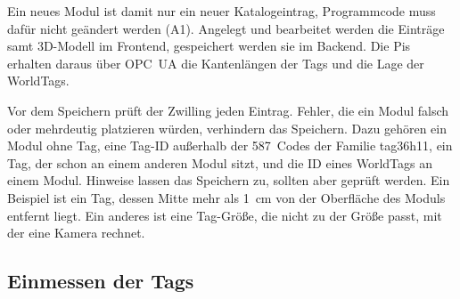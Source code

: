 Ein neues Modul ist damit nur ein neuer Katalogeintrag, Programmcode muss dafür nicht geändert werden (A1). Angelegt und bearbeitet werden die Einträge samt 3D-Modell im Frontend, gespeichert werden sie im Backend. Die Pis erhalten daraus über OPC~UA die Kantenlängen der Tags und die Lage der WorldTags.

Vor dem Speichern prüft der Zwilling jeden Eintrag. Fehler, die ein Modul falsch oder mehrdeutig platzieren würden, verhindern das Speichern. Dazu gehören ein Modul ohne Tag, eine Tag-ID außerhalb der 587~Codes der Familie tag36h11, ein Tag, der schon an einem anderen Modul sitzt, und die ID eines WorldTags an einem Modul. Hinweise lassen das Speichern zu, sollten aber geprüft werden. Ein Beispiel ist ein Tag, dessen Mitte mehr als \SI{1}{\centi\metre} von der Oberfläche des Moduls entfernt liegt. Ein anderes ist eine Tag-Größe, die nicht zu der Größe passt, mit der eine Kamera rechnet.

\subsection{Einmessen der Tags}
\label{subsec:dz-tag-einmessen}

